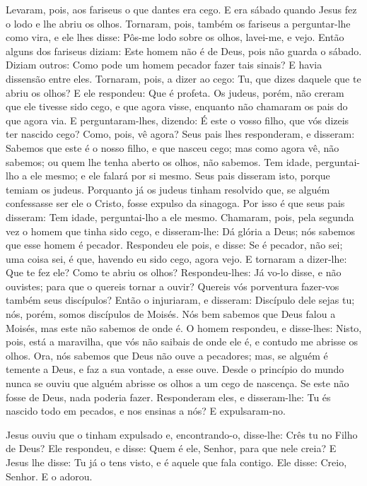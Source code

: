 Levaram, pois, aos fariseus o que dantes era cego. E era
sábado quando Jesus fez o lodo e lhe abriu os olhos.
Tornaram, pois, também os fariseus a perguntar-lhe como vira,
e ele lhes disse: Pôs-me lodo sobre os olhos, lavei-me, e vejo.
Então alguns dos fariseus diziam: Este homem não é de Deus,
pois não guarda o sábado. Diziam outros: Como pode um homem pecador
fazer tais sinais? E havia dissensão entre eles. Tornaram,
pois, a dizer ao cego: Tu, que dizes daquele que te abriu os olhos?
E ele respondeu: Que é profeta. Os judeus, porém, não creram
que ele tivesse sido cego, e que agora visse, enquanto não chamaram
os pais do que agora via. E perguntaram-lhes, dizendo: É este
o vosso filho, que vós dizeis ter nascido cego? Como, pois, vê
agora? Seus pais lhes responderam, e disseram: Sabemos que
este é o nosso filho, e que nasceu cego; mas como agora vê,
não sabemos; ou quem lhe tenha aberto os olhos, não sabemos. Tem
idade, perguntai-lho a ele mesmo; e ele falará por si mesmo.
Seus pais disseram isto, porque temiam os judeus. Porquanto
já os judeus tinham resolvido que, se alguém confessasse ser ele o
Cristo, fosse expulso da sinagoga. Por isso é que seus pais
disseram: Tem idade, perguntai-lho a ele mesmo. Chamaram,
pois, pela segunda vez o homem que tinha sido cego, e disseram-lhe:
Dá glória a Deus; nós sabemos que esse homem é pecador.
Respondeu ele pois, e disse: Se é pecador, não sei; uma coisa
sei, é que, havendo eu sido cego, agora vejo. E tornaram a
dizer-lhe: Que te fez ele? Como te abriu os olhos?
Respondeu-lhes: Já vo-lo disse, e não ouvistes; para que o
quereis tornar a ouvir? Quereis vós porventura fazer-vos também seus
discípulos? Então o injuriaram, e disseram: Discípulo dele
sejas tu; nós, porém, somos discípulos de Moisés. Nós bem
sabemos que Deus falou a Moisés, mas este não sabemos de onde é.
O homem respondeu, e disse-lhes: Nisto, pois, está a
maravilha, que vós não saibais de onde ele é, e contudo me abrisse
os olhos. Ora, nós sabemos que Deus não ouve a pecadores;
mas, se alguém é temente a Deus, e faz a sua vontade, a esse ouve.
Desde o princípio do mundo nunca se ouviu que alguém abrisse
os olhos a um cego de nascença. Se este não fosse de Deus,
nada poderia fazer. Responderam eles, e disseram-lhe: Tu és
nascido todo em pecados, e nos ensinas a nós? E expulsaram-no.

Jesus ouviu que o tinham expulsado e, encontrando-o, disse-lhe:
Crês tu no Filho de Deus? Ele respondeu, e disse: Quem é ele,
Senhor, para que nele creia? E Jesus lhe disse: Tu já o tens
visto, e é aquele que fala contigo. Ele disse: Creio, Senhor.
E o adorou.

